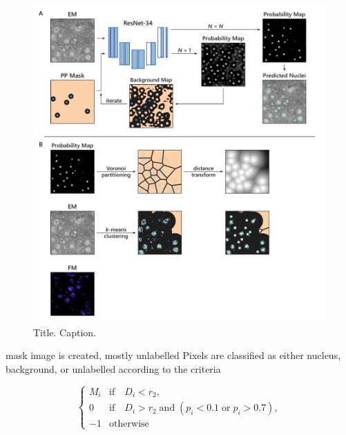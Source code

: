 \begin{figure}[!tb]
    \centering
    \includegraphics[width=\linewidth]{chapter-4/figures_PDF/fig4-M5_segmentation.pdf}
    \caption{Title.
    Caption.}
    \label{fig:5M_segmentation}
\end{figure}






mask image is created, mostly unlabelled
Pixels are classified as either nucleus, background, or unlabelled according to the criteria

\begin{equation}
    \begin{cases}
      M_i & \text{if} \quad D_i < r_2, \\
      0 & \text{if} \quad D_i > r_2 \;\text{and}\; (p_i < 0.1 \;\text{or}\; p_i > 0.7), \\
      -1 & \text{otherwise}
    \end{cases}
\end{equation}


